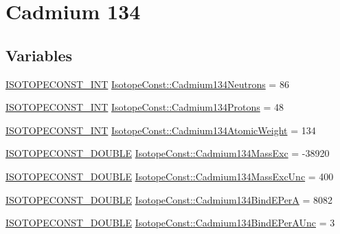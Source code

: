 \hypertarget{group___isotope_const-_cadmium-_cd134}{}\section{Cadmium 134}
\label{group___isotope_const-_cadmium-_cd134}
\subsection*{Variables}
\begin{DoxyCompactItemize}
\item 
\mbox{\hyperlink{group___isotope_const-_macros_ga5f18360b3e99483a35c32d789e62621c}{I\+S\+O\+T\+O\+P\+E\+C\+O\+N\+S\+T\+\_\+\+I\+NT}} \mbox{\hyperlink{group___isotope_const-_cadmium-_cd134_ga324f7f51c3fa6f9beeca48ec88b8d34b}{Isotope\+Const\+::\+Cadmium134\+Neutrons}} = 86
\item 
\mbox{\hyperlink{group___isotope_const-_macros_ga5f18360b3e99483a35c32d789e62621c}{I\+S\+O\+T\+O\+P\+E\+C\+O\+N\+S\+T\+\_\+\+I\+NT}} \mbox{\hyperlink{group___isotope_const-_cadmium-_cd134_gade406317094d2750c84bfbcce1f08710}{Isotope\+Const\+::\+Cadmium134\+Protons}} = 48
\item 
\mbox{\hyperlink{group___isotope_const-_macros_ga5f18360b3e99483a35c32d789e62621c}{I\+S\+O\+T\+O\+P\+E\+C\+O\+N\+S\+T\+\_\+\+I\+NT}} \mbox{\hyperlink{group___isotope_const-_cadmium-_cd134_ga45889cb9a214b89f4a9d779f9e08e132}{Isotope\+Const\+::\+Cadmium134\+Atomic\+Weight}} = 134
\item 
\mbox{\hyperlink{group___isotope_const-_macros_ga8f45a7272ce02c0b4c65c44636ed719a}{I\+S\+O\+T\+O\+P\+E\+C\+O\+N\+S\+T\+\_\+\+D\+O\+U\+B\+LE}} \mbox{\hyperlink{group___isotope_const-_cadmium-_cd134_ga24aa74985d9d6656bfa20ec91e257be4}{Isotope\+Const\+::\+Cadmium134\+Mass\+Exc}} = -\/38920
\item 
\mbox{\hyperlink{group___isotope_const-_macros_ga8f45a7272ce02c0b4c65c44636ed719a}{I\+S\+O\+T\+O\+P\+E\+C\+O\+N\+S\+T\+\_\+\+D\+O\+U\+B\+LE}} \mbox{\hyperlink{group___isotope_const-_cadmium-_cd134_ga609205e23900ae4616ee533c9e5a270f}{Isotope\+Const\+::\+Cadmium134\+Mass\+Exc\+Unc}} = 400
\item 
\mbox{\hyperlink{group___isotope_const-_macros_ga8f45a7272ce02c0b4c65c44636ed719a}{I\+S\+O\+T\+O\+P\+E\+C\+O\+N\+S\+T\+\_\+\+D\+O\+U\+B\+LE}} \mbox{\hyperlink{group___isotope_const-_cadmium-_cd134_ga6527965a37eb37dfc3875127998c60cc}{Isotope\+Const\+::\+Cadmium134\+Bind\+E\+PerA}} = 8082
\item 
\mbox{\hyperlink{group___isotope_const-_macros_ga8f45a7272ce02c0b4c65c44636ed719a}{I\+S\+O\+T\+O\+P\+E\+C\+O\+N\+S\+T\+\_\+\+D\+O\+U\+B\+LE}} \mbox{\hyperlink{group___isotope_const-_cadmium-_cd134_gaffac2de77c473b7ce1ae77cfcea5536a}{Isotope\+Const\+::\+Cadmium134\+Bind\+E\+Per\+A\+Unc}} = 3

\end{DoxyCompactItemize}
